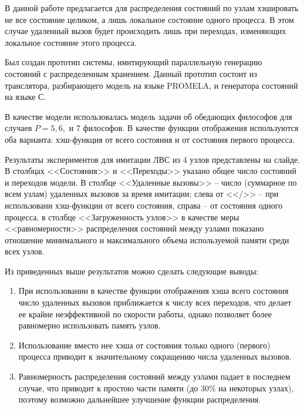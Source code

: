 \documentclass[a4paper,12pt,notitlepage]{article}
\begin{document}
В данной работе предлагается для распределения состояний по узлам
хэшировать не все состояние целиком, а лишь локальное состояние одного
процесса. В этом случае удаленный вызов будет происходить лишь при
переходах, изменяющих локальное состояние этого процесса.

Был создан прототип системы, имитирующий параллельную генерацию
состояний с распределенным хранением. Данный прототип состоит из
транслятора, разбирающего модель на языке PROMELA, и генератора
состояний на языке С.

В качестве модели использовалась модель задачи об обедающих философов
для случаев $P = 5, 6, \text{ и } 7$ философов. В качестве функции
отображения используются оба варианта: хэш-функция от всего состояния
и от состояния первого процесса.

Результаты экспериментов для имитации ЛВС из 4 узлов представлены на
слайде. В столбцах <<Состояния>> и <<Переходы>> указано общее число
состояний и переходов модели. В столбце <<Удаленные вызовы>> -- число
(суммарное по всем узлам) удаленных вызовов за время имитации; слева
от <</>> -- при использовани хэш-функции от всего состояния, справа --
от состояния одного процесса. в столбце <<Загруженность узлов>> в
качестве меры <<равномерности>> распределения состояний между узлами
показано отношение минимального и максимального объема используемой
памяти среди всех узлов.

Из приведенных выше результатов можно сделать следующие выводы:

\begin{enumerate}
\item При использовании в качестве функции отображения хэша всего
  состояния число удаленных вызовов приближается к числу всех
  переходов, что делает ее крайне неэффективной по скорости работы,
  однако позволяет более равномерно использовать память узлов.

\item Использование вместо нее хэша от состояния только одного
  (первого) процесса приводит к значительному сокращению числа
  удаленных вызовов.

\item Равномерность распределения состояний между узлами падает в последнем
  случае, что приводит к простою части памяти  (до 30\% на некоторых узлах),
  поэтому возможно дальнейшее улучшение функции распределения.
\end{enumerate}
\end{document}
